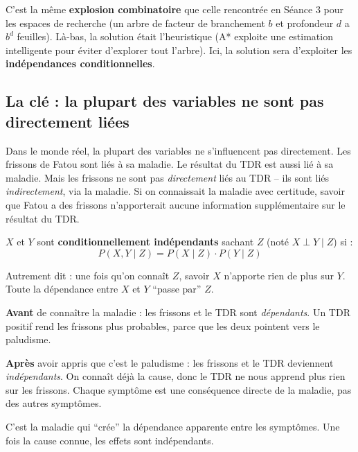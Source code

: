 \documentclass[11pt,a4paper]{article}
\begin{document}
C'est la même \textbf{explosion combinatoire} que celle rencontrée en Séance 3 pour les espaces de recherche (un arbre de facteur de branchement $b$ et profondeur $d$ a $b^d$ feuilles). Là-bas, la solution était l'heuristique (A* exploite une estimation intelligente pour éviter d'explorer tout l'arbre). Ici, la solution sera d'exploiter les \textbf{indépendances conditionnelles}.

\subsection{La clé : la plupart des variables ne sont pas directement liées}

Dans le monde réel, la plupart des variables ne s'influencent pas directement. Les frissons de Fatou sont liés à sa maladie. Le résultat du TDR est aussi lié à sa maladie. Mais les frissons ne sont pas \textit{directement} liés au TDR -- ils sont liés \textit{indirectement}, via la maladie. Si on connaissait la maladie avec certitude, savoir que Fatou a des frissons n'apporterait aucune information supplémentaire sur le résultat du TDR.

\begin{definitionbox}
$X$ et $Y$ sont \textbf{conditionnellement indépendants} sachant $Z$ (noté $X \perp Y \mid Z$) si :
$$P(X, Y \mid Z) = P(X \mid Z) \cdot P(Y \mid Z)$$

Autrement dit  : une fois qu'on connaît $Z$, savoir $X$ n'apporte rien de plus sur $Y$. Toute la dépendance entre $X$ et $Y$ ``passe par'' $Z$.
\end{definitionbox}

\begin{exemplebox}
\textbf{Avant} de connaître la maladie : les frissons et le TDR sont \textit{dépendants}. Un TDR positif rend les frissons plus probables, parce que les deux pointent vers le paludisme.

\textbf{Après} avoir appris que c'est le paludisme : les frissons et le TDR deviennent \textit{indépendants}. On connaît déjà la cause, donc le TDR ne nous apprend plus rien sur les frissons. Chaque symptôme est une conséquence directe de la maladie, pas des autres symptômes.

C'est la maladie qui ``crée'' la dépendance apparente entre les symptômes. Une fois la cause connue, les effets sont indépendants.
\end{exemplebox}
\end{document}
